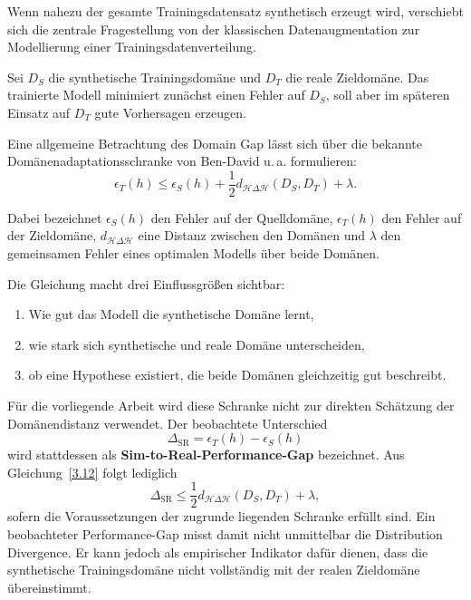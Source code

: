 Wenn nahezu der gesamte Trainingsdatensatz synthetisch erzeugt wird, verschiebt sich die zentrale Fragestellung von der klassischen Datenaugmentation zur Modellierung einer Trainingsdatenverteilung.

Sei $D_S$ die synthetische Trainingsdomäne und $D_T$ die reale Zieldomäne. Das trainierte Modell minimiert zunächst einen Fehler auf $D_S$, soll aber im späteren Einsatz auf $D_T$ gute Vorhersagen erzeugen.

Eine allgemeine Betrachtung des Domain Gap lässt sich über die bekannte Domänenadaptationsschranke von Ben-David u.\,a. formulieren:
\begin{equation}
\epsilon_T(h)
\leq
\epsilon_S(h)
+
\frac{1}{2}
d_{\mathcal H\Delta\mathcal H}(D_S,D_T)
+
\lambda.
\tag{3.12}
\end{equation}

Dabei bezeichnet $\epsilon_S(h)$ den Fehler auf der Quelldomäne, $\epsilon_T(h)$ den Fehler auf der Zieldomäne, $d_{\mathcal H\Delta\mathcal H}$ eine Distanz zwischen den Domänen und $\lambda$ den gemeinsamen Fehler eines optimalen Modells über beide Domänen.

Die Gleichung macht drei Einflussgrößen sichtbar:
\begin{enumerate}
    \item Wie gut das Modell die synthetische Domäne lernt,
    \item wie stark sich synthetische und reale Domäne unterscheiden,
    \item ob eine Hypothese existiert, die beide Domänen gleichzeitig gut beschreibt.
\end{enumerate}

Für die vorliegende Arbeit wird diese Schranke nicht zur direkten Schätzung der Domänendistanz verwendet. Der beobachtete Unterschied
\begin{equation}
\Delta_{\mathrm{SR}}
=
\epsilon_T(h)-\epsilon_S(h)
\tag{3.13}
\end{equation}
wird stattdessen als \textbf{Sim-to-Real-Performance-Gap} bezeichnet. Aus Gleichung~\eqref{3.12} folgt lediglich
\begin{equation}
\Delta_{\mathrm{SR}}
\leq
\frac{1}{2}
d_{\mathcal H\Delta\mathcal H}(D_S,D_T)
+
\lambda,
\tag{3.14}
\end{equation}
sofern die Voraussetzungen der zugrunde liegenden Schranke erfüllt sind. Ein beobachteter Performance-Gap misst damit nicht unmittelbar die Distribution Divergence. Er kann jedoch als empirischer Indikator dafür dienen, dass die synthetische Trainingsdomäne nicht vollständig mit der realen Zieldomäne übereinstimmt.

